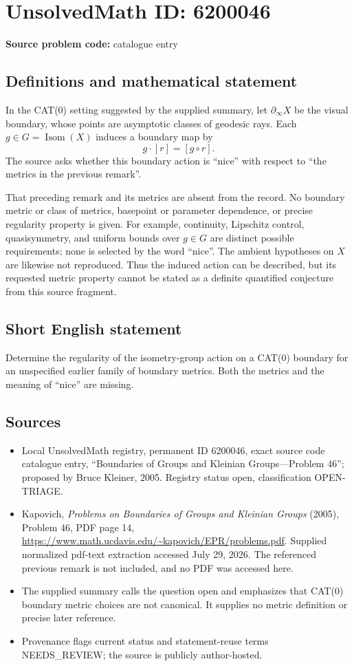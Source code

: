 \documentclass[11pt]{article}
\begin{document}
\section*{UnsolvedMath ID: 6200046}
\textbf{Source problem code:} catalogue entry
\subsection{Definitions and mathematical statement}
In the CAT(0) setting suggested by the supplied summary, let $\partial_\infty X$ be the visual boundary, whose points are asymptotic classes of geodesic rays. Each $g\in G=\operatorname{Isom}(X)$ induces a boundary map by
\[
g\cdot[r]=[g\circ r].
\]
The source asks whether this boundary action is ``nice'' with respect to ``the metrics in the previous remark''.

That preceding remark and its metrics are absent from the record. No boundary metric or class of metrics, basepoint or parameter dependence, or precise regularity property is given. For example, continuity, Lipschitz control, quasisymmetry, and uniform bounds over $g\in G$ are distinct possible requirements; none is selected by the word ``nice''. The ambient hypotheses on $X$ are likewise not reproduced. Thus the induced action can be described, but its requested metric property cannot be stated as a definite quantified conjecture from this source fragment.
\subsection{Short English statement}
Determine the regularity of the isometry-group action on a CAT(0) boundary for an unspecified earlier family of boundary metrics. Both the metrics and the meaning of ``nice'' are missing.
\subsection{Sources}
\begin{itemize}
\item Local UnsolvedMath registry, permanent ID 6200046, exact source code catalogue entry, ``Boundaries of Groups and Kleinian Groups---Problem 46''; proposed by Bruce Kleiner, 2005. Registry status open, classification OPEN-TRIAGE.
\item Kapovich, \emph{Problems on Boundaries of Groups and Kleinian Groups} (2005), Problem 46, PDF page 14, \url{https://www.math.ucdavis.edu/~kapovich/EPR/problems.pdf}. Supplied normalized pdf-text extraction accessed July 29, 2026. The referenced previous remark is not included, and no PDF was accessed here.
\item The supplied summary calls the question open and emphasizes that CAT(0) boundary metric choices are not canonical. It supplies no metric definition or precise later reference.
\item Provenance flags current status and statement-reuse terms NEEDS\_REVIEW; the source is publicly author-hosted.
\end{itemize}
\end{document}
